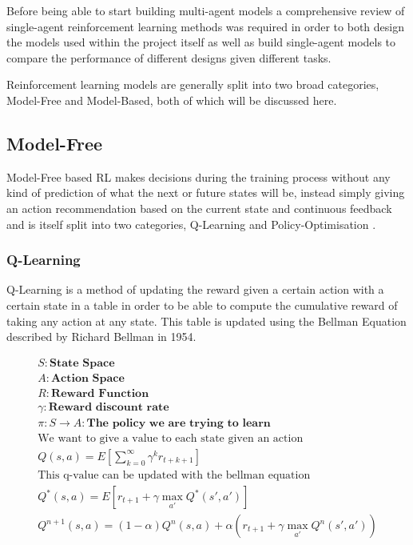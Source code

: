 \documentclass{article}
\begin{document}
Before being able to start building multi-agent models a comprehensive review of single-agent reinforcement learning methods was required in order to both design the models used within the project itself as well as build single-agent models to compare the performance of different designs given different tasks. 

Reinforcement learning models are generally split into two broad categories, Model-Free and Model-Based, both of which will be discussed here. 


\subsection{Model-Free}
Model-Free based RL makes decisions during the training process without any kind of prediction of what the next or future states will be, instead simply giving an action recommendation based on the current state and continuous feedback and is itself split into two categories, Q-Learning and Policy-Optimisation \cite{Huang2020Model-basedLearning}.
 \\
 \subsubsection{Q-Learning}
Q-Learning is a method of updating the reward given a certain action with a certain state in a table in order to be able to compute the cumulative reward of taking any action at any state. This table is updated using the Bellman Equation described by Richard Bellman in 1954\cite{RichardBellman1954TheProgramming}.


\begin{align*}
&    S: \textbf{State Space} \\
&    A: \textbf{Action Space} \\
&    R: \textbf{Reward Function} \\
&    \gamma: \textbf{Reward discount rate} \\
&    \pi : S \rightarrow A: \textbf{The policy we are trying to learn}
&    \\
&    \text{We want to give a value to each state given an action }\\
&    Q(s,a) = E[\sum^{\infty}_{k=0}\gamma^k r_{t+k+1}] \\
&    \text{This q-value can be updated with the bellman equation} \\
&    Q^*(s,a) = E[r_{t+1} + \gamma \max_{a'} Q^*(s',a')] \\
&    Q^{n+1}(s,a) = (1-\alpha)Q^{n}(s,a) + \alpha(r_{t+1} + \gamma \max_{a'} Q^{n}(s',a'))
\end{align*}
\end{document}
